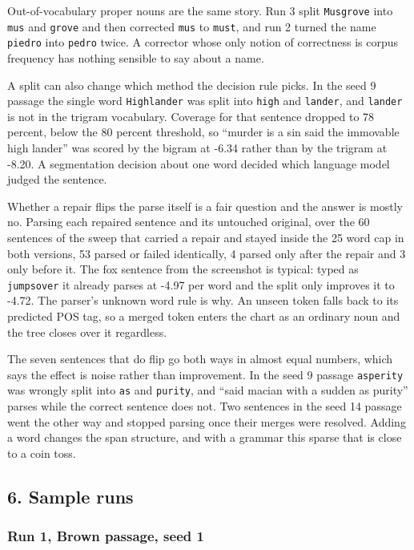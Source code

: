 \documentclass[11pt,a4paper]{article}
\begin{document}
Out-of-vocabulary proper nouns are the same story. Run 3 split \texttt{Musgrove} into \texttt{mus} and \texttt{grove} and then corrected \texttt{mus} to \texttt{must}, and run 2 turned the name \texttt{piedro} into \texttt{pedro} twice. A corrector whose only notion of correctness is corpus frequency has nothing sensible to say about a name.

A split can also change which method the decision rule picks. In the seed 9 passage the single word \texttt{Highlander} was split into \texttt{high} and \texttt{lander}, and \texttt{lander} is not in the trigram vocabulary. Coverage for that sentence dropped to 78 percent, below the 80 percent threshold, so ``murder is a sin said the immovable high lander'' was scored by the bigram at -6.34 rather than by the trigram at -8.20. A segmentation decision about one word decided which language model judged the sentence.

Whether a repair flips the parse itself is a fair question and the answer is mostly no. Parsing each repaired sentence and its untouched original, over the 60 sentences of the sweep that carried a repair and stayed inside the 25 word cap in both versions, 53 parsed or failed identically, 4 parsed only after the repair and 3 only before it. The fox sentence from the screenshot is typical: typed as \texttt{jumpsover} it already parses at -4.97 per word and the split only improves it to -4.72. The parser's unknown word rule is why. An unseen token falls back to its predicted POS tag, so a merged token enters the chart as an ordinary noun and the tree closes over it regardless.

The seven sentences that do flip go both ways in almost equal numbers, which says the effect is noise rather than improvement. In the seed 9 passage \texttt{asperity} was wrongly split into \texttt{as} and \texttt{purity}, and ``said macian with a sudden as purity'' parses while the correct sentence does not. Two sentences in the seed 14 passage went the other way and stopped parsing once their merges were resolved. Adding a word changes the span structure, and with a grammar this sparse that is close to a coin toss.

\subsection*{6. Sample runs}

\subsubsection*{Run 1, Brown passage, seed 1}
\end{document}
